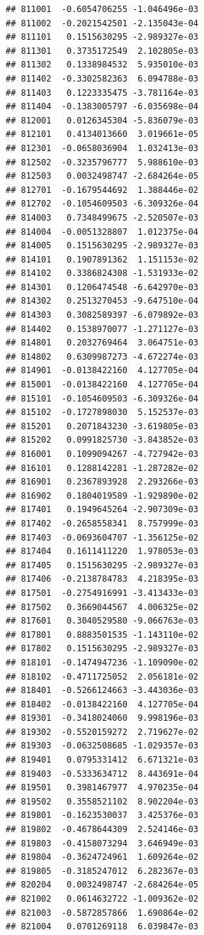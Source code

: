 \documentclass[ignorenonframetext,]{beamer}
\begin{document}
\begin{frame}[fragile]
\begin{verbatim}
## 811001  -0.6054706255 -1.046496e-03
## 811002  -0.2021542501 -2.135043e-04
## 811101   0.1515630295 -2.989327e-03
## 811301   0.3735172549  2.102805e-03
## 811302   0.1338984532  5.935010e-03
## 811402  -0.3302582363  6.094788e-03
## 811403   0.1223335475 -3.781164e-03
## 811404  -0.1383005797 -6.035698e-04
## 812001   0.0126345304 -5.836079e-03
## 812101   0.4134013660  3.019661e-05
## 812301  -0.0658036904  1.032413e-03
## 812502  -0.3235796777  5.988610e-03
## 812503   0.0032498747 -2.684264e-05
## 812701  -0.1679544692  1.388446e-02
## 812702  -0.1054609503 -6.309326e-04
## 814003   0.7348499675 -2.520507e-03
## 814004  -0.0051328807  1.012375e-04
## 814005   0.1515630295 -2.989327e-03
## 814101   0.1907891362  1.151153e-02
## 814102   0.3386824308 -1.531933e-02
## 814301   0.1206474548 -6.642970e-03
## 814302   0.2513270453 -9.647510e-04
## 814303   0.3082589397 -6.079892e-03
## 814402   0.1538970077 -1.271127e-03
## 814801   0.2032769464  3.064751e-03
## 814802   0.6309987273 -4.672274e-03
## 814901  -0.0138422160  4.127705e-04
## 815001  -0.0138422160  4.127705e-04
## 815101  -0.1054609503 -6.309326e-04
## 815102  -0.1727898030  5.152537e-03
## 815201   0.2071843230 -3.619805e-03
## 815202   0.0991825730 -3.843852e-03
## 816001   0.1099094267 -4.727942e-03
## 816101   0.1288142281 -1.287282e-02
## 816901   0.2367893928  2.293266e-03
## 816902   0.1804019589 -1.929890e-02
## 817401   0.1949645264 -2.907309e-03
## 817402  -0.2658558341  8.757999e-03
## 817403  -0.0693604707 -1.356125e-02
## 817404   0.1611411220  1.978053e-03
## 817405   0.1515630295 -2.989327e-03
## 817406  -0.2138784783  4.218395e-03
## 817501  -0.2754916991 -3.413433e-03
## 817502   0.3669044567  4.006325e-02
## 817601   0.3040529580 -9.066763e-03
## 817801   0.8883501535 -1.143110e-02
## 817802   0.1515630295 -2.989327e-03
## 818101  -0.1474947236 -1.109090e-02
## 818102  -0.4711725052  2.056181e-02
## 818401  -0.5266124663 -3.443036e-03
## 818402  -0.0138422160  4.127705e-04
## 819301  -0.3418024060  9.998196e-03
## 819302  -0.5520159272  2.719627e-02
## 819303  -0.0632508685 -1.029357e-03
## 819401   0.0795331412  6.671321e-03
## 819403  -0.5333634712  8.443691e-04
## 819501   0.3981467977  4.970235e-04
## 819502   0.3558521102  8.902204e-03
## 819801  -0.1623530037  3.425376e-03
## 819802  -0.4678644309  2.524146e-03
## 819803  -0.4158073294  3.646949e-03
## 819804  -0.3624724961  1.609264e-02
## 819805  -0.3185247012  6.282367e-03
## 820204   0.0032498747 -2.684264e-05
## 821002   0.0614632722 -1.009362e-02
## 821003  -0.5872857866  1.690864e-02
## 821004   0.0701269118  6.039847e-03

\end{verbatim}
\end{frame}
\end{document}
